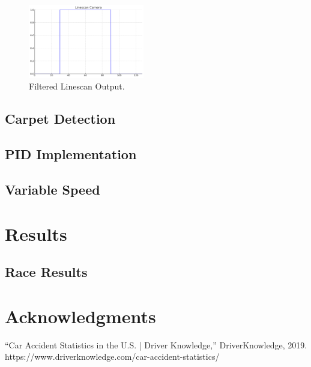 \documentclass[conference]{IEEEtran}
\begin{document}
\begin{figure}[htbp]
	\centerline{\includegraphics[width=0.45\textwidth]{images/linescanFiltered.png}}
	\caption{Filtered Linescan Output.}
	\label{fig:linescanFiltered}
\end{figure}

\subsection{Carpet Detection}

\subsection{PID Implementation}

\subsection{Variable Speed}

\section{Results}

\subsection{Race Results}


\section*{Acknowledgments}

\begin{thebibliography}{00}
 “Car Accident Statistics in the U.S. | Driver Knowledge,” DriverKnowledge, 2019. https://www.driverknowledge.com/car-accident-statistics/
\end{thebibliography}
\end{document}
